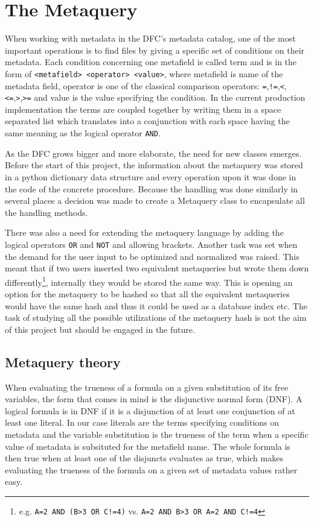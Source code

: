 \chapter{The Metaquery}

When working with metadata in the DFC's metadata catalog, one of the most important operations is 
to find files by giving a specific set of conditions on their metadata. Each condition concerning
one metafield is called term and is in the form of \texttt{<metafield> <operator> <value>}, where
metafield is name of the metadata field, operator is one of the classical comparison operators:
\texttt{=},\texttt{!=},\texttt{<},\texttt{<=},\texttt{>},\texttt{>=} and value is the value
specifying the condition. In the current production implementation the terms are coupled 
together by writing them in a space separated list which translates into a conjunction with
each space having the same meaning as the logical operator \texttt{AND}.

As the DFC grows bigger and more elaborate, the need for new classes emerges. Before the 
start of this project, the information about the metaquery was stored in a python dictionary
data structure and every operation upon it was done in the code of the concrete procedure. 
Because the handling was done similarly in several places a decision was made to create a 
Metaquery class to encapsulate all the handling methods. 

There was also a need for extending the metaquery language by adding the logical operators 
\texttt{OR} and \texttt{NOT} and allowing brackets. Another task was set when the demand for
the user input to be optimized and normalized was raised. This meant that if two users 
inserted two equivalent metaqueries but wrote them down 
differently\footnote{e.g. \texttt{A=2 AND (B>3 OR C!=4)} vs. \texttt{A=2 AND B>3 OR A=2 AND C!=4}}, 
internally they would be stored the same way. This is opening an option for the metaquery 
to be hashed so that all the equivalent metaqueries would have the same hash and thus it 
could be used as a database index etc. The task of studying all the possible utilizations of the 
metaquery hash is not the aim of this project but should be engaged in the future. 

\section{Metaquery theory}

When evaluating the trueness of a formula on a given substitution of its free variables, the 
form that comes in mind is the disjunctive normal form (DNF). A logical formula is in DNF if
it is a disjunction of at least one conjunction of at least one literal. In our case literals 
are the terms specifying conditions on metadata and the variable substitution is the trueness
of the term when a specific value of metadata is subsituted for the metafield name. The whole
formula is then true when at least one of the disjuncts evaluates as true, which makes evaluating
the trueness of the formula on a given set of metadata values rather easy.

